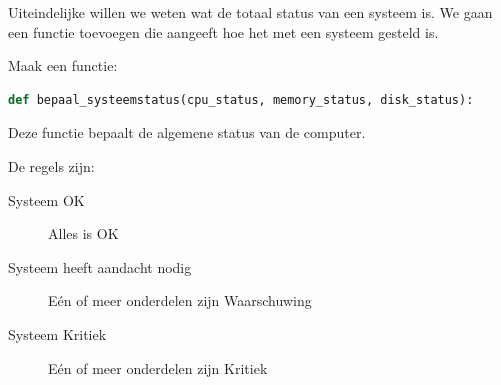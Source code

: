 Uiteindelijke willen we weten wat de totaal status van een systeem is. We gaan een functie toevoegen die aangeeft hoe het met een systeem gesteld is.

Maak een functie:
\begin{lstlisting}[language=Python]
def bepaal_systeemstatus(cpu_status, memory_status, disk_status):
\end{lstlisting}

Deze functie bepaalt de algemene status van de computer.

De regels zijn:
\begin{description}
\item[Systeem OK] Alles is OK
\item[Systeem heeft aandacht nodig] E\'en of meer onderdelen zijn Waarschuwing
\item[Systeem Kritiek] E\'en of meer onderdelen zijn Kritiek
\end{description}

